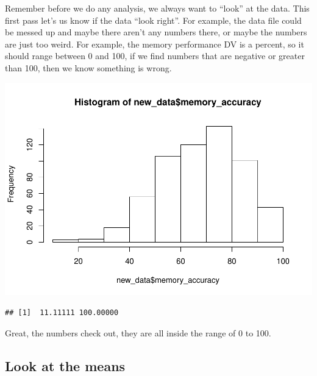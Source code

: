 \documentclass[]{book}
\newenvironment{Shaded}{\begin{snugshade}}{\end{snugshade}}
\newcommand{\KeywordTok}[1]{\textcolor[rgb]{0.13,0.29,0.53}{\textbf{#1}}}
\newcommand{\OperatorTok}[1]{\textcolor[rgb]{0.81,0.36,0.00}{\textbf{#1}}}
\newcommand{\NormalTok}[1]{#1}
\begin{document}
Remember before we do any analysis, we always want to ``look'' at the
data. This first pass let's us know if the data ``look right''. For
example, the data file could be messed up and maybe there aren't any
numbers there, or maybe the numbers are just too weird. For example, the
memory performance DV is a percent, so it should range between 0 and
100, if we find numbers that are negative or greater than 100, then we
know something is wrong.

\begin{Shaded}
\end{Shaded}

\includegraphics{Statistics_Lab_files/figure-latex/unnamed-chunk-329-1.pdf}

\begin{Shaded}
\end{Shaded}

\begin{verbatim}
## [1]  11.11111 100.00000
\end{verbatim}

Great, the numbers check out, they are all inside the range of 0 to 100.

\subsection{Look at the means}\label{look-at-the-means-2}
\end{document}
